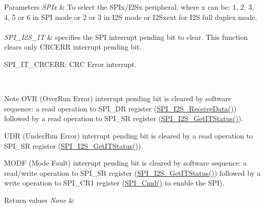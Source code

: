 \begin{DoxyParams}{Parameters}
{\em S\+P\+Ix} & To select the S\+P\+Ix/\+I2\+Sx peripheral, where x can be\+: 1, 2, 3, 4, 5 or 6 in S\+PI mode or 2 or 3 in I2S mode or I2\+Sxext for I2S full duplex mode. ~\newline
\\
\hline
{\em S\+P\+I\+\_\+\+I2\+S\+\_\+\+IT} & specifies the S\+PI interrupt pending bit to clear. This function clears only C\+R\+C\+E\+RR interrupt pending bit. ~\newline
 \begin{DoxyItemize}
\item S\+P\+I\+\_\+\+I\+T\+\_\+\+C\+R\+C\+E\+RR\+: C\+RC Error interrupt.\end{DoxyItemize}
\\
\hline
\end{DoxyParams}
\begin{DoxyNote}{Note}
O\+VR (Over\+Run Error) interrupt pending bit is cleared by software sequence\+: a read operation to S\+P\+I\+\_\+\+DR register (\mbox{\hyperlink{group___s_p_i___group2_gab77de76547f3bff403236b263b070a30}{S\+P\+I\+\_\+\+I2\+S\+\_\+\+Receive\+Data()}}) followed by a read operation to S\+P\+I\+\_\+\+SR register (\mbox{\hyperlink{group___s_p_i___group5_ga72decbc1cd79f8fad92a2204beca6bc5}{S\+P\+I\+\_\+\+I2\+S\+\_\+\+Get\+I\+T\+Status()}}). 

U\+DR (Under\+Run Error) interrupt pending bit is cleared by a read operation to S\+P\+I\+\_\+\+SR register (\mbox{\hyperlink{group___s_p_i___group5_ga72decbc1cd79f8fad92a2204beca6bc5}{S\+P\+I\+\_\+\+I2\+S\+\_\+\+Get\+I\+T\+Status()}}). ~\newline


M\+O\+DF (Mode Fault) interrupt pending bit is cleared by software sequence\+: a read/write operation to S\+P\+I\+\_\+\+SR register (\mbox{\hyperlink{group___s_p_i___group5_ga72decbc1cd79f8fad92a2204beca6bc5}{S\+P\+I\+\_\+\+I2\+S\+\_\+\+Get\+I\+T\+Status()}}) followed by a write operation to S\+P\+I\+\_\+\+C\+R1 register (\mbox{\hyperlink{group___s_p_i___group1_gaa31357879a65ee1ed7223f3b9114dcf3}{S\+P\+I\+\_\+\+Cmd()}} to enable the S\+PI). 
\end{DoxyNote}

\begin{DoxyRetVals}{Return values}
{\em None} & \\
\hline
\end{DoxyRetVals}
\mbox{\label{group___s_p_i___group5_ga1bd785d129e09c5734a876c8f2767204}} 
